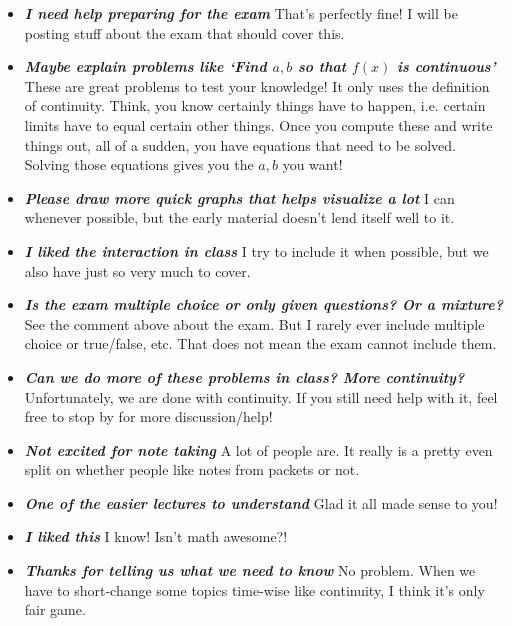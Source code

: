 \documentclass[11pt,letterpaper]{article}
\begin{document}
\begin{itemize}
\item {\bfseries\itshape I need help preparing for the exam} That's perfectly fine! I will be posting stuff about the exam that should cover this. 

\item {\bfseries\itshape Maybe explain problems like `Find $a, b$ so that $f(x)$ is continuous'} These are great problems to test your knowledge! It only uses the definition of continuity. Think, you know certainly things have to happen, i.e. certain limits have to equal certain other things. Once you compute these and write things out, all of a sudden, you have equations that need to be solved. Solving those equations gives you the $a, b$ you want!

\item {\bfseries\itshape Please draw more quick graphs that helps visualize a lot} I can whenever possible, but the early material doesn't lend itself well to it. 

\item {\bfseries\itshape I liked the interaction in class} I try to include it when possible, but we also have just so very much to cover. 

\item {\bfseries\itshape Is the exam multiple choice or only given questions? Or a mixture?} See the comment above about the exam. But I rarely ever include multiple choice or true/false, etc. That does not mean the exam cannot include them. 

\item {\bfseries\itshape Can we do more of these problems in class? More continuity?} Unfortunately, we are done with continuity. If you still need help with it, feel free to stop by for more discussion/help!

\item {\bfseries\itshape Not excited for note taking} A lot of people are. It really is a pretty even split on whether people like notes from packets or not. 

\item {\bfseries\itshape One of the easier lectures to understand} Glad it all made sense to you!

\item {\bfseries\itshape I liked this} I know! Isn't math awesome?!

\item {\bfseries\itshape Thanks for telling us what we need to know} No problem. When we have to short-change some topics time-wise like continuity, I think it's only fair game. 


\end{itemize}
\end{document}
